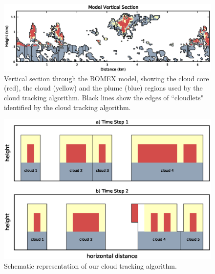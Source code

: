 \documentclass[acp]{copernicus}
\begin{document}
\begin{figure}[t]
\vspace*{2mm}
\begin{center}
\includegraphics[width=\textwidth]{./figures/vertical_section}
\end{center}
\caption{Vertical section through the BOMEX model, showing the cloud core
(red), the cloud (yellow) and the plume (blue) regions used by the cloud 
tracking algorithm. Black lines show the edges of ``cloudlets" identified by 
the cloud tracking algorithm.}
\label{fig:vertical_section}
\end{figure}

\begin{figure}[t]
\vspace*{2mm}
\begin{center}
\includegraphics[width=\textwidth]{./figures/cloudfinder_instructions}
\end{center}
\caption{Schematic representation of our cloud tracking algorithm.}
\label{fig:cloudfinder_instructions}
\end{figure}
\end{document}
